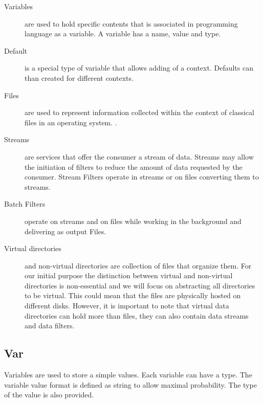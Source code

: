 \documentclass[9pt,twocolumn]{styles/osajnl}
\begin{document}
\begin{description}
\item[Variables] are used to hold specific contents that is associated
  in programming language as a variable. A variable has a name, value
  and type.

\item[Default] is a special type of variable that allows adding of a
  context. Defaults can than created for different contexts.

\item[Files] are used to represent information collected within the
  context of classical files in an operating system. .

\item[Streams] are services that offer the consumer a stream of
  data. Streams may allow the initiation of filters to reduce the
  amount of data requested by the consumer.  Stream Filters operate in
  streams or on files converting them to streams.

\item[Batch Filters] operate on streams and on files while working in
  the background and delivering as output Files. 

\item[Virtual directories] and non-virtual directories are collection
  of files that organize them. For our initial purpose the distinction
  between virtual and non-virtual directories is non-essential and we
  will focus on abstracting all directories to be virtual. This could
  mean that the files are physically hosted on different
  disks. However, it is important to note that virtual data
  directories can hold more than files, they can also contain data
  streams and data filters. 

\end{description}

\subsection{Var}

Variables are used to store a simple values. Each variable can have a
type. The variable value format is defined as string to allow maximal
probability. The type of the value is also provided.
\end{document}
